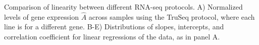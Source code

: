 Comparison of linearity between different RNA-seq protocols.  A) Normalized levels of gene expression $\hat{A}$ across samples using the TruSeq protocol, where each line is for a different gene.  B-E) Distributions of slopes, intercepts, and correlation coefficient for linear regressions of the data, as in panel A. 